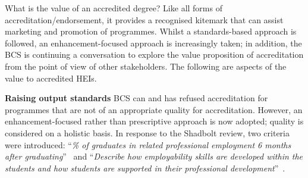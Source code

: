 \documentclass[sigconf]{acmart}
\begin{document}
What is the value of an accredited degree? Like all forms of
accreditation/endorsement, it provides a recognised kitemark that can
assist marketing and promotion of programmes. Whilst a standards-based
approach is followed, an enhancement-focused approach is increasingly
taken; in addition, the BCS is continuing a conversation to explore
the value proposition of accreditation from the point of view of other
stakeholders. The following are aspects of the value to accredited
HEIs.

{\textbf{Raising output standards}}
BCS can and has refused accreditation for programmes that are not of
an appropriate quality for accreditation. However, an
enhancement-focused rather than prescriptive approach is now adopted;
quality is considered on a holistic basis. In response to the Shadbolt
review, two criteria were introduced: ``{\emph{\% of graduates in
related professional employment 6 months after graduating}}''~\cite
[p8]{BCS2019b} and ``{\emph{Describe how employability skills are
developed within the students and how students are supported in their
professional development}}''~\cite [p3]{BCS2019b}.
\end{document}
